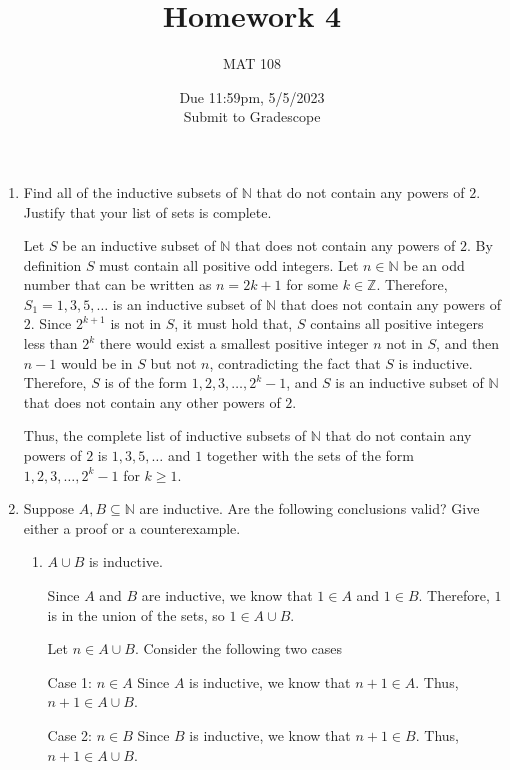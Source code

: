 \documentclass{article}
\title{Homework 4}
\author{MAT 108}
\date{Due 11:59pm, 5/5/2023\\ 
\vspace{0.1cm}
Submit to Gradescope}
\newcommand{\bZ}{\mathbb{Z}}
\newcommand{\bN}{\mathbb{N}}
\begin{document}
\maketitle

{\large

\begin{enumerate}[labelindent=0pt,leftmargin=0pt]

    \setlength{\itemsep}{13pt} 

    \item Find all of the inductive subsets of $\bN$ that do not contain any powers of $2$. Justify that your list of sets is complete.

    Let $S$ be an inductive subset of $\bN$ that does not contain any powers of $2$. 
    By definition $S$  must contain all positive odd integers.
    Let $n\in\bN$ be an odd number that can be written as $n=2k+1$ for some $k\in\bZ$.
    Therefore, $S_1={1,3,5,\ldots}$ is an inductive subset of $\bN$ that does not contain any powers of $2$. Since $2^{k+1}$ is not in $S$, it must hold that, $S$ contains all positive integers less than $2^k$ there would exist a smallest positive integer $n$ not in $S$, and then $n-1$ would be in $S$ but not $n$, contradicting the fact that $S$ is inductive. 
    Therefore, $S$ is of the form ${1,2,3,\ldots,2^k-1}$, and $S$ is an inductive subset of $\bN$ that does not contain any other powers of $2$.
    
    Thus, the complete list of inductive subsets of $\bN$ that do not contain any powers of $2$ is ${1,3,5,\ldots}$ and ${1}$ together with the sets of the form ${1,2,3,\ldots,2^k-1}$ for $k\geq 1$.




    \item Suppose $A,B\subseteq\bN$ are inductive. Are the following conclusions valid? Give either a proof or a counterexample.

    \begin{enumerate}
    \item $A\cup B$ is inductive.
    
    Since $A$ and $B$ are inductive, we know that $1 \in A$ and $1 \in B$. Therefore, $1$ is in the union of the sets, so $1 \in A \cup B$.

    Let $n \in A \cup B$. Consider the following two cases 

    Case 1: $n \in A$
    Since $A$ is inductive, we know that $n+1 \in A$. Thus, $n+1 \in A \cup B$.

    Case 2: $n \in B$
    Since $B$ is inductive, we know that $n+1 \in B$. Thus, $n+1 \in A \cup B$.


\end{enumerate}
\end{enumerate}}
\end{document}
